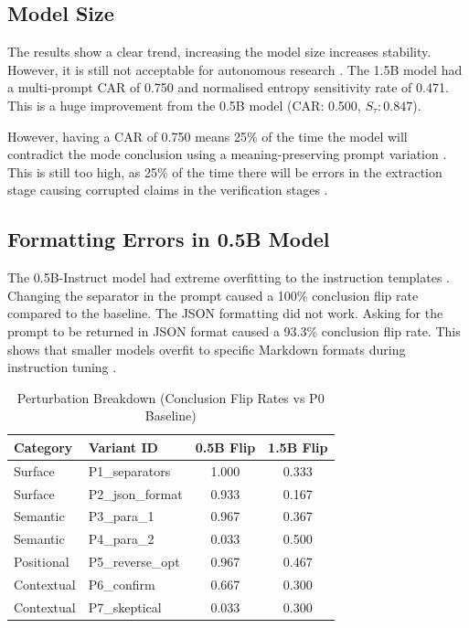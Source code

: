 \documentclass[10pt, conference, letterpaper]{IEEEtran}
\begin{document}
\subsection{Model Size}
The results show a clear trend, increasing the model size increases stability. However, it is still not acceptable for autonomous research \cite{qwen2024}. The 1.5B model had a multi-prompt CAR of 0.750 and normalised entropy sensitivity rate of 0.471. This is a huge improvement from the 0.5B model (CAR: 0.500, $S_{\tau}: 0.847$).

However, having a CAR of 0.750 means 25\% of the time the model will contradict the mode conclusion using a meaning-preserving prompt variation \cite{errica2025wrong}. This is still too high, as 25\% of the time there will be errors in the extraction stage causing corrupted claims in the verification stages \cite{wu2023agentbench}.

\subsection{Formatting Errors in 0.5B Model}
The 0.5B-Instruct model had extreme overfitting to the instruction templates \cite{sclar2024quantifying}. Changing the separator in the prompt caused a 100\% conclusion flip rate compared to the baseline. The JSON formatting did not work. Asking for the prompt to be returned in JSON format caused a 93.3\% conclusion flip rate. This shows that smaller models overfit to specific Markdown formats during instruction tuning \cite{ouyang2022training}.

\begin{table}[htbp]
\centering
\caption{Perturbation Breakdown (Conclusion Flip Rates vs P0 Baseline)}
\label{tab:breakdown}
\begin{tabular}{@{}llcc@{}}
\toprule
\textbf{Category} & \textbf{Variant ID} & \textbf{0.5B Flip} & \textbf{1.5B Flip} \\ \midrule
Surface & P1\_separators & 1.000 & 0.333 \\
Surface & P2\_json\_format & 0.933 & 0.167 \\
Semantic & P3\_para\_1 & 0.967 & 0.367 \\
Semantic & P4\_para\_2 & 0.033 & 0.500 \\
Positional & P5\_reverse\_opt & 0.967 & 0.467 \\
Contextual & P6\_confirm & 0.667 & 0.300 \\
Contextual & P7\_skeptical & 0.033 & 0.300 \\ \bottomrule
\end{tabular}
\end{table}
\end{document}
